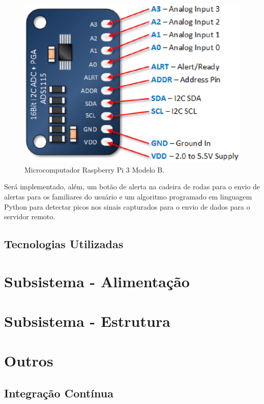 \begin{figure}[H]
  \centering
    \includegraphics[width=\textwidth]{figuras/ads.eps}
  \caption{Microcomputador Raspberry Pi 3 Modelo B.}
  \label{fig:ads}
\end{figure}



Será implementado, além, um botão de alerta na cadeira de rodas para o envio de alertas 
para os familiares do usuário e um algoritmo programado em linguagem Python para 
detectar picos nos sinais capturados para o envio de dados para o servidor remoto.



\subsection{Tecnologias Utilizadas}

\section{Subsistema - Alimentação}

\section{Subsistema - Estrutura}

\section{Outros}

\subsection{Integração Contínua}
